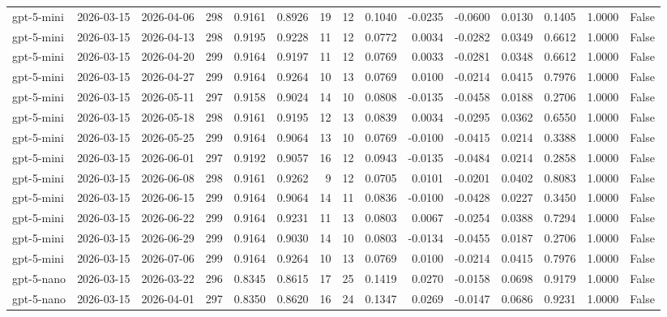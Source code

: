 \begin{table}
\begin{tabular}{lllrrrrrrrrrrrr}
gpt-5-mini & 2026-03-15 & 2026-04-06 & 298 & 0.9161 & 0.8926 & 19 & 12 & 0.1040 & -0.0235 & -0.0600 & 0.0130 & 0.1405 & 1.0000 & False \\
gpt-5-mini & 2026-03-15 & 2026-04-13 & 298 & 0.9195 & 0.9228 & 11 & 12 & 0.0772 & 0.0034 & -0.0282 & 0.0349 & 0.6612 & 1.0000 & False \\
gpt-5-mini & 2026-03-15 & 2026-04-20 & 299 & 0.9164 & 0.9197 & 11 & 12 & 0.0769 & 0.0033 & -0.0281 & 0.0348 & 0.6612 & 1.0000 & False \\
gpt-5-mini & 2026-03-15 & 2026-04-27 & 299 & 0.9164 & 0.9264 & 10 & 13 & 0.0769 & 0.0100 & -0.0214 & 0.0415 & 0.7976 & 1.0000 & False \\
gpt-5-mini & 2026-03-15 & 2026-05-11 & 297 & 0.9158 & 0.9024 & 14 & 10 & 0.0808 & -0.0135 & -0.0458 & 0.0188 & 0.2706 & 1.0000 & False \\
gpt-5-mini & 2026-03-15 & 2026-05-18 & 298 & 0.9161 & 0.9195 & 12 & 13 & 0.0839 & 0.0034 & -0.0295 & 0.0362 & 0.6550 & 1.0000 & False \\
gpt-5-mini & 2026-03-15 & 2026-05-25 & 299 & 0.9164 & 0.9064 & 13 & 10 & 0.0769 & -0.0100 & -0.0415 & 0.0214 & 0.3388 & 1.0000 & False \\
gpt-5-mini & 2026-03-15 & 2026-06-01 & 297 & 0.9192 & 0.9057 & 16 & 12 & 0.0943 & -0.0135 & -0.0484 & 0.0214 & 0.2858 & 1.0000 & False \\
gpt-5-mini & 2026-03-15 & 2026-06-08 & 298 & 0.9161 & 0.9262 & 9 & 12 & 0.0705 & 0.0101 & -0.0201 & 0.0402 & 0.8083 & 1.0000 & False \\
gpt-5-mini & 2026-03-15 & 2026-06-15 & 299 & 0.9164 & 0.9064 & 14 & 11 & 0.0836 & -0.0100 & -0.0428 & 0.0227 & 0.3450 & 1.0000 & False \\
gpt-5-mini & 2026-03-15 & 2026-06-22 & 299 & 0.9164 & 0.9231 & 11 & 13 & 0.0803 & 0.0067 & -0.0254 & 0.0388 & 0.7294 & 1.0000 & False \\
gpt-5-mini & 2026-03-15 & 2026-06-29 & 299 & 0.9164 & 0.9030 & 14 & 10 & 0.0803 & -0.0134 & -0.0455 & 0.0187 & 0.2706 & 1.0000 & False \\
gpt-5-mini & 2026-03-15 & 2026-07-06 & 299 & 0.9164 & 0.9264 & 10 & 13 & 0.0769 & 0.0100 & -0.0214 & 0.0415 & 0.7976 & 1.0000 & False \\
gpt-5-nano & 2026-03-15 & 2026-03-22 & 296 & 0.8345 & 0.8615 & 17 & 25 & 0.1419 & 0.0270 & -0.0158 & 0.0698 & 0.9179 & 1.0000 & False \\
gpt-5-nano & 2026-03-15 & 2026-04-01 & 297 & 0.8350 & 0.8620 & 16 & 24 & 0.1347 & 0.0269 & -0.0147 & 0.0686 & 0.9231 & 1.0000 & False \\

\end{tabular}
\end{table}
